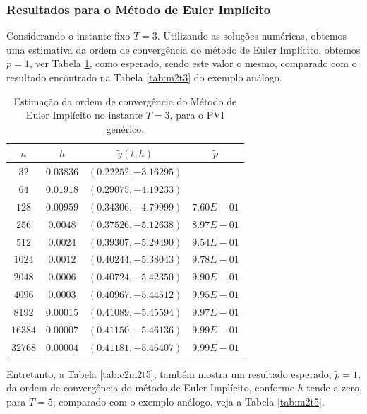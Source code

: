 \documentclass[twocolumn,amsmath,amssymb,floatfix]{revtex4}
\begin{document}
\subsubsection{Resultados para o Método de Euler Implícito}
Considerando o instante fixo $T=3$. Utilizando as soluções numéricas, obtemos uma estimativa da ordem de convergência do método de Euler Implícito, obtemos $\tilde{p}=1$, ver Tabela \ref{tab:c2m2t3}, como esperado, sendo este valor o mesmo, comparado com o resultado encontrado na Tabela \ref{tab:m2t3} do exemplo análogo.
\begin{table}[H]
 \centering
 \begin{tabular}{ c|c|c|c }
  \hline
  \hline
  $n$  & $h$  & $\tilde{y}(t,h)$ & $\tilde{p}$ \\
  \hline
  \hline
$32$&$0.03836$&	$  (   0.22252,   -3.16295)$ &	$ $ \\
\hline
$64$&$0.01918$&$  (   0.29075,   -4.19233)$&$ $\\
\hline
$128$&$0.00959	 $&$  (   0.34306,   -4.79999)	$&$7.60E-01$\\
\hline
$256$&$0.0048	 $&$ (   0.37526,   -5.12638)	$&$8.97E-01$\\
\hline
$512$&$0.0024	 $&$  (   0.39307,   -5.29490)	$&$9.54E-01$\\
\hline
$1024$&$0.0012	 $&$  (   0.40244,   -5.38043)	$&$9.78E-01$\\
\hline
$2048$&$0.0006	 $&$  (   0.40724,   -5.42350)	$&$9.90E-01$\\
\hline
$4096$&$0.0003	 $&$  (   0.40967,   -5.44512)	$&$9.95E-01$\\
\hline
$8192$&$0.00015	 $&$  (   0.41089,   -5.45594)	$&$9.97E-01$\\
\hline
$16384$&$0.00007	 $&$  (   0.41150,   -5.46136)	$&$9.99E-01$\\
\hline
$32768$&$0.00004	 $&$ (   0.41181,   -5.46407)	$&$9.99E-01$\\
  \hline
  \hline
 \end{tabular}
   \caption{Estimação da ordem de convergência do Método de Euler Implícito no instante $T=3$, para o PVI genérico.} \label{tab:c2m2t3}
\end{table}

Entretanto, a Tabela \ref{tab:c2m2t5}, também mostra um resultado esperado, $\tilde{p}=1$, da ordem de convergência do método de Euler Implícito, conforme $h$ tende a zero, para $ T=5$; comparado com o exemplo análogo, veja a Tabela \ref{tab:m2t5}.
\end{document}
